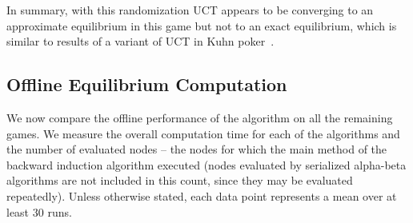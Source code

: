 In summary, with this randomization UCT appears to be converging to an approximate equilibrium in this game but not to an
exact equilibrium, which is similar to results of a variant of UCT in Kuhn poker~\cite{Ponsen11Computing}.



\subsection{Offline Equilibrium Computation} \label{sec:eval:offline}

We now compare the offline performance of the algorithm on all the remaining games.
We measure the overall computation time for each of the algorithms and the number of evaluated nodes -- \ie the nodes for which the main method of the backward induction algorithm executed (nodes evaluated by serialized alpha-beta algorithms are not included in this count, since they may be evaluated repeatedly).
Unless otherwise stated, each data point represents a mean over at least $30$ runs.

